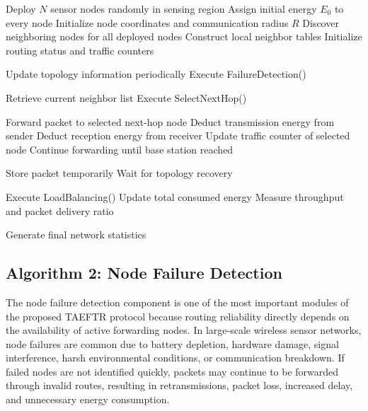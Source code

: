 \documentclass[a4paper,fleqn]{cas-dc}
\numberwithin{equation}{section}
\begin{document}
\begin{algorithm}[!ht]
\caption{Algorithm 1: TAEFTR Main Routing Procedure}
\label{alg:main}
\begin{algorithmic}[1]

\STATE Deploy $N$ sensor nodes randomly in sensing region
\STATE Assign initial energy $E_0$ to every node
\STATE Initialize node coordinates and communication radius $R$
\STATE Discover neighboring nodes for all deployed nodes
\STATE Construct local neighbor tables
\STATE Initialize routing status and traffic counters


    \STATE Update topology information periodically
    \STATE Execute FailureDetection()


        \STATE Retrieve current neighbor list
        \STATE Execute SelectNextHop()


            \STATE Forward packet to selected next-hop node
            \STATE Deduct transmission energy from sender
            \STATE Deduct reception energy from receiver
            \STATE Update traffic counter of selected node
            \STATE Continue forwarding until base station reached

        \ELSE

            \STATE Store packet temporarily
            \STATE Wait for topology recovery

        \ENDIF

    \ENDFOR

    \STATE Execute LoadBalancing()
    \STATE Update total consumed energy
    \STATE Measure throughput and packet delivery ratio

\ENDWHILE

\STATE Generate final network statistics

\end{algorithmic}
\end{algorithm}
\subsection{Algorithm 2: Node Failure Detection}

The node failure detection component is one of the most important modules of the proposed TAEFTR protocol because routing reliability directly depends on the availability of active forwarding nodes. In large-scale wireless sensor networks, node failures are common due to battery depletion, hardware damage, signal interference, harsh environmental conditions, or communication breakdown. If failed nodes are not identified quickly, packets may continue to be forwarded through invalid routes, resulting in retransmissions, packet loss, increased delay, and unnecessary energy consumption.
\end{document}
